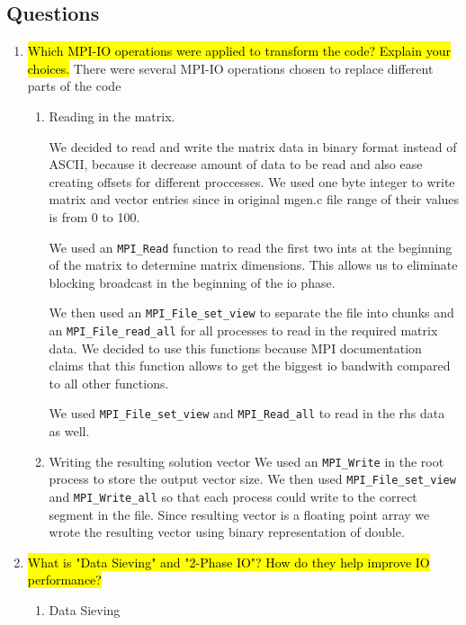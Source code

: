 \subsection{Questions}
\begin{enumerate}
  \item \hl{Which MPI-IO operations were applied to transform the code? Explain your choices.}
  There were several MPI-IO operations chosen to replace different parts of the code
  \begin{enumerate}
  \item Reading in the matrix.
  
  We decided to read and write the matrix data in binary format instead of ASCII, because it decrease amount of data to be read
  and also ease creating offsets for different proccesses. We used one byte integer to write matrix and vector entries
  since in original mgen.c file range of their values is from 0 to 100.


  We used an \verb!MPI_Read! function to read the first two ints at the beginning of the matrix to determine matrix dimensions.
  This allows us to eliminate blocking broadcast in the beginning of the io phase.

  We then used an \verb!MPI_File_set_view! to separate the file into chunks and an \verb!MPI_File_read_all! for all 
  processes to read in the required matrix data. We decided to use this functions because MPI documentation claims
  that this function allows to get the biggest io bandwith compared to all other functions.
  
  We used \verb!MPI_File_set_view! and \verb!MPI_Read_all! to read in the rhs data as well.
  
  \item Writing the resulting solution vector
  We used an \verb!MPI_Write! in the root process to store the output vector size. We then used \verb!MPI_File_set_view!
  and \verb!MPI_Write_all! so that each process could write to the correct segment in the file. Since resulting vector 
  is a floating point array we wrote the resulting vector using binary representation of double.
  
  \end{enumerate}
  
  \item \hl{What is "Data Sieving" and "2-Phase IO"? How do they help improve IO
performance?}
	\begin{enumerate}
	\item Data Sieving
	

\end{enumerate}
\end{enumerate}
